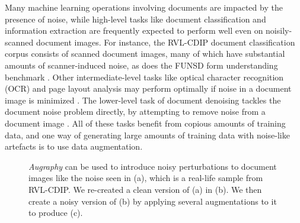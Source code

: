 \documentclass[runningheads]{llncs}
\begin{document}
Many machine learning operations involving documents are impacted by the presence of noise, while high-level tasks like document classification and information extraction are frequently expected to perform well even on noisily-scanned document images.
For instance, the RVL-CDIP document classification corpus \cite{harley2015icdar-rvlcdip} consists of scanned document images, many of which have substantial amounts of scanner-induced noise, as does the FUNSD form understanding benchmark \cite{jaume2019-funsd}.
Other intermediate-level tasks like optical character recognition (OCR) and page layout analysis may perform optimally if noise in a document image is minimized \cite{character-recognition-systems,ogorman-document-image-analysis,Rotman2022-hh}.
The lower-level task of document denoising tackles the document noise problem directly, by attempting to remove noise from a document image \cite{ref_noisyoffice,blind-denoising-iccv-2021,kulkarni-2020,patch-based-document-denoising,Mustafa_2018-wan}.
All of these tasks benefit from copious amounts of training data, and one way of generating large amounts of training data with noise-like artefacts is to use data augmentation.

\begin{figure}
    \centering
    
    
    \caption{\emph{Augraphy} can be used to introduce noisy perturbations to document images like the noise seen in (a), which is a real-life sample from  RVL-CDIP. We re-created a clean version of (a) in (b). We then create a noisy version of (b) by applying several augmentations to it to produce (c).}

    \label{fig:intro}
\end{figure}
\end{document}
